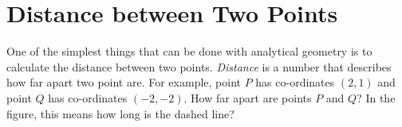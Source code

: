             \section{ Distance between Two Points}
            \nopagebreak
            \label{m39107*id66786}One of the simplest things that can be done with analytical geometry is to calculate the distance between two points. \textsl{Distance} is a number that describes how far apart two point are. For example, point \begin{math}P\end{math} has co-ordinates \begin{math}\left(2,1\right)\end{math} and point \begin{math}Q\end{math} has co-ordinates \begin{math}\left(-2,-2\right)\end{math}. How far apart are points \begin{math}P\end{math} and \begin{math}Q\end{math}? In the figure, this means how long is the dashed line?\par 
        
    \setcounter{subfigure}{0}


